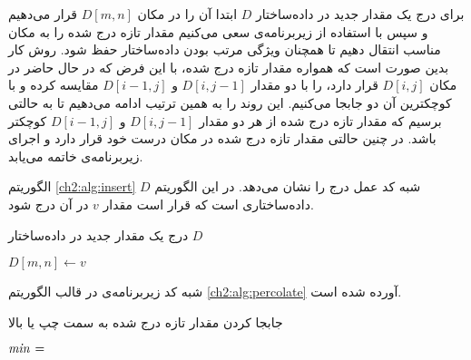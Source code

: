 برای درج یک مقدار جدید در داده‌ساختار {$D$} ابتدا آن را در مکان {$D[m,n]$} قرار می‌دهیم و سپس با استفاده از زیربرنامه‌ی
{} سعی می‌کنیم مقدار تازه درج شده را به مکان مناسب انتقال دهیم تا همچنان ویژگی مرتب بودن داده‌ساختار حفظ شود. روش کار بدین صورت است که همواره مقدار تازه درج شده، با این فرض که در حال حاضر در مکان {$D[i,j]$} قرار دارد، را با دو مقدار {$D[i,j-1]$} و {$D[i-1,j]$} مقایسه کرده و با کوچکترین آن دو جابجا می‌کنیم. این روند را به همین ترتیب ادامه می‌دهیم تا به حالتی برسیم که مقدار تازه درج شده از هر دو مقدار {$D[i,j-1]$} و {$D[i-1,j]$} کوچکتر باشد. در چنین حالتی  مقدار تازه درج شده در مکان درست خود قرار دارد و اجرای زیربرنامه‌ی {} خاتمه می‌یابد.

الگوریتم {\ref{ch2:alg:insert}} شبه کد عمل درج را نشان می‌دهد. در این الگوریتم {$D$} داده‌ساختاری است که قرار است مقدار {$v$} در آن درج شود.
\begin{algorithm}
\caption{درج یک مقدار جدید در داده‌ساختار {$D$}}\label{ch2:alg:insert}
\begin{latin}
\begin{algorithmic}[1]
		\State	$D[m,n] \gets v$
		\State	{}
\EndProcedure
\end{algorithmic}
\end{latin}
\end{algorithm}

شبه کد زیربرنامه‌ی {} در قالب الگوریتم {\ref{ch2:alg:percolate}} آورده شده است.
\begin{algorithm}
\caption{جابجا کردن مقدار تازه درج شده به سمت چپ یا بالا}\label{ch2:alg:percolate}
\begin{latin}
\begin{algorithmic}[1]
		\State	$\mathit{min} \mathrel{\hspace{1pt}=\hspace{1pt}}$ 
				\State	\Return
				\State	{}
				\State	{}
		\Else
				\State	{}
				\State	{}
		\EndIf		
\EndProcedure
\end{algorithmic}
\end{latin}
\end{algorithm}

